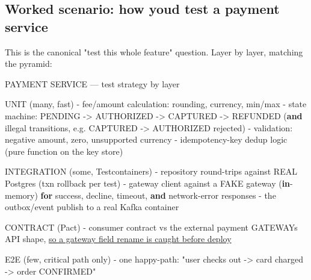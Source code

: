 \documentclass[11pt]{article}
\newenvironment{Shaded}{\begin{snugshade}}{\end{snugshade}}
\newcommand{\BuiltInTok}[1]{\textcolor[rgb]{0.50,0.55,0.55}{#1}}
\newcommand{\ControlFlowTok}[1]{\textcolor[rgb]{0.99,0.74,0.29}{\textbf{#1}}}
\newcommand{\ErrorTok}[1]{\textcolor[rgb]{0.85,0.27,0.33}{\underline{#1}}}
\newcommand{\KeywordTok}[1]{\textcolor[rgb]{0.81,0.81,0.76}{\textbf{#1}}}
\newcommand{\NormalTok}[1]{\textcolor[rgb]{0.81,0.81,0.76}{#1}}
\newcommand{\OperatorTok}[1]{\textcolor[rgb]{0.81,0.81,0.76}{#1}}
\newcommand{\StringTok}[1]{\textcolor[rgb]{0.96,0.31,0.31}{#1}}
\begin{document}
\subsection{Worked scenario: how you\textquotesingle d test a payment service}\label{worked-scenario-how-youd-test-a-payment-service}

This is the canonical "test this whole feature" question. Layer by layer, matching the pyramid:


\begin{Shaded}
\begin{Highlighting}[]
\NormalTok{   PAYMENT SERVICE — test strategy by layer}

\NormalTok{   UNIT (many, fast)}
     \OperatorTok{{-}}\NormalTok{ fee}\OperatorTok{/}\NormalTok{amount calculation: rounding, currency, }\BuiltInTok{min}\OperatorTok{/}\BuiltInTok{max}
     \OperatorTok{{-}}\NormalTok{ state machine: PENDING }\OperatorTok{{-}\textgreater{}}\NormalTok{ AUTHORIZED }\OperatorTok{{-}\textgreater{}}\NormalTok{ CAPTURED }\OperatorTok{{-}\textgreater{}}\NormalTok{ REFUNDED}
\NormalTok{       (}\KeywordTok{and}\NormalTok{ illegal transitions, e.g. CAPTURED }\OperatorTok{{-}\textgreater{}}\NormalTok{ AUTHORIZED rejected)}
     \OperatorTok{{-}}\NormalTok{ validation: negative amount, zero, unsupported currency}
     \OperatorTok{{-}}\NormalTok{ idempotency}\OperatorTok{{-}}\NormalTok{key dedup logic (pure function on the key store)}

\NormalTok{   INTEGRATION (some, Testcontainers)}
     \OperatorTok{{-}}\NormalTok{ repository }\BuiltInTok{round}\OperatorTok{{-}}\NormalTok{trips against REAL Postgres (txn rollback per test)}
     \OperatorTok{{-}}\NormalTok{ gateway client against a FAKE gateway (}\KeywordTok{in}\OperatorTok{{-}}\NormalTok{memory) }\ControlFlowTok{for}\NormalTok{ success,}
\NormalTok{       decline, timeout, }\KeywordTok{and}\NormalTok{ network}\OperatorTok{{-}}\NormalTok{error responses}
     \OperatorTok{{-}}\NormalTok{ the outbox}\OperatorTok{/}\NormalTok{event publish to a real Kafka container}

\NormalTok{   CONTRACT (Pact)}
     \OperatorTok{{-}}\NormalTok{ consumer contract vs the external payment GATEWAY}\StringTok{\textquotesingle{}s API shape,}
\ErrorTok{       so a gateway field rename is caught before deploy}

\NormalTok{   E2E (few, critical path only)}
     \OperatorTok{{-}}\NormalTok{ one happy}\OperatorTok{{-}}\NormalTok{path: }\StringTok{"user checks out {-}\textgreater{} card charged {-}\textgreater{} order CONFIRMED"}


\end{Highlighting}
\end{Shaded}
\end{document}
